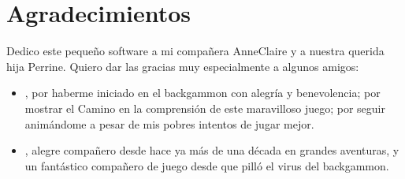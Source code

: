 \documentclass[letterpaper,10pt,spanish]{sphinxmanual}
\begin{document}
\chapter{Agradecimientos}
\label{\detokenize{index:remerciements}}
\sphinxAtStartPar
Dedico este pequeño software a mi compañera Anne\sphinxhyphen{}Claire y a nuestra querida hija Perrine. Quiero dar las gracias muy especialmente a algunos amigos:
\begin{itemize}
\item {} 
\sphinxAtStartPar
{}, por haberme iniciado en el backgammon con alegría y benevolencia; por mostrar el Camino en la comprensión de este maravilloso juego; por seguir animándome a pesar de mis pobres intentos de jugar mejor.

\item {} 
\sphinxAtStartPar
{}, alegre compañero desde hace ya más de una década en grandes aventuras, y un fantástico compañero de juego desde que pilló el virus del backgammon.

\end{itemize}



\renewcommand{\indexname}{Índice}
\printindex
\end{document}
